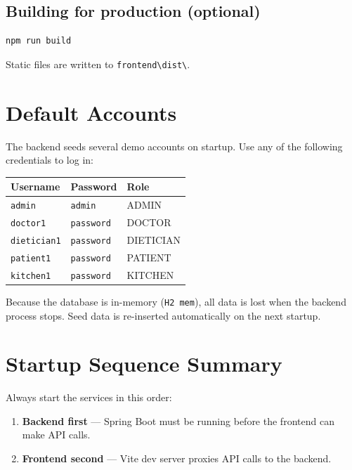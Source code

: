 \documentclass[12pt,a4paper]{article}
\begin{document}
\subsection{Building for production (optional)}
\begin{lstlisting}
npm run build
\end{lstlisting}

Static files are written to \texttt{frontend\textbackslash dist\textbackslash}.

\section{Default Accounts}

The backend seeds several demo accounts on startup.  Use any of the
following credentials to log in:

\begin{center}
\begin{tabular}{lll}
\toprule
\textbf{Username} & \textbf{Password} & \textbf{Role} \\
\midrule
\texttt{admin}    & \texttt{admin}    & ADMIN \\
\texttt{doctor1}  & \texttt{password} & DOCTOR \\
\texttt{dietician1} & \texttt{password} & DIETICIAN \\
\texttt{patient1} & \texttt{password} & PATIENT \\
\texttt{kitchen1} & \texttt{password} & KITCHEN \\
\bottomrule
\end{tabular}
\end{center}

\begin{note}
Because the database is in-memory (\texttt{H2 mem}), all data is lost when
the backend process stops.  Seed data is re-inserted automatically on the
next startup.
\end{note}

\section{Startup Sequence Summary}

Always start the services in this order:

\begin{enumerate}
  \item \textbf{Backend first} — Spring Boot must be running before the
        frontend can make API calls.
  \item \textbf{Frontend second} — Vite dev server proxies API calls to the
        backend.
\end{enumerate}
\end{document}
